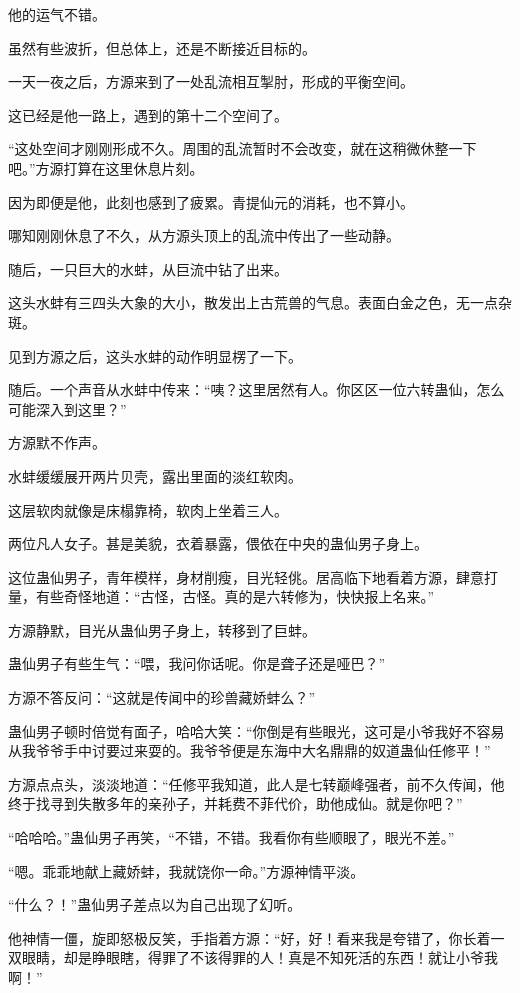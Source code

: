 \begin{this_body}
他的运气不错。

虽然有些波折，但总体上，还是不断接近目标的。

一天一夜之后，方源来到了一处乱流相互掣肘，形成的平衡空间。

这已经是他一路上，遇到的第十二个空间了。

“这处空间才刚刚形成不久。周围的乱流暂时不会改变，就在这稍微休整一下吧。”方源打算在这里休息片刻。

因为即便是他，此刻也感到了疲累。青提仙元的消耗，也不算小。

哪知刚刚休息了不久，从方源头顶上的乱流中传出了一些动静。

随后，一只巨大的水蚌，从巨流中钻了出来。

这头水蚌有三四头大象的大小，散发出上古荒兽的气息。表面白金之色，无一点杂斑。

见到方源之后，这头水蚌的动作明显楞了一下。

随后。一个声音从水蚌中传来：“咦？这里居然有人。你区区一位六转蛊仙，怎么可能深入到这里？”

方源默不作声。

水蚌缓缓展开两片贝壳，露出里面的淡红软肉。

这层软肉就像是床榻靠椅，软肉上坐着三人。

两位凡人女子。甚是美貌，衣着暴露，偎依在中央的蛊仙男子身上。

这位蛊仙男子，青年模样，身材削瘦，目光轻佻。居高临下地看着方源，肆意打量，有些奇怪地道：“古怪，古怪。真的是六转修为，快快报上名来。”

方源静默，目光从蛊仙男子身上，转移到了巨蚌。

蛊仙男子有些生气：“喂，我问你话呢。你是聋子还是哑巴？”

方源不答反问：“这就是传闻中的珍兽藏娇蚌么？”

蛊仙男子顿时倍觉有面子，哈哈大笑：“你倒是有些眼光，这可是小爷我好不容易从我爷爷手中讨要过来耍的。我爷爷便是东海中大名鼎鼎的奴道蛊仙任修平！”

方源点点头，淡淡地道：“任修平我知道，此人是七转巅峰强者，前不久传闻，他终于找寻到失散多年的亲孙子，并耗费不菲代价，助他成仙。就是你吧？”

“哈哈哈。”蛊仙男子再笑，“不错，不错。我看你有些顺眼了，眼光不差。”

“嗯。乖乖地献上藏娇蚌，我就饶你一命。”方源神情平淡。

“什么？！”蛊仙男子差点以为自己出现了幻听。

他神情一僵，旋即怒极反笑，手指着方源：“好，好！看来我是夸错了，你长着一双眼睛，却是睁眼瞎，得罪了不该得罪的人！真是不知死活的东西！就让小爷我啊！”


\end{this_body}
